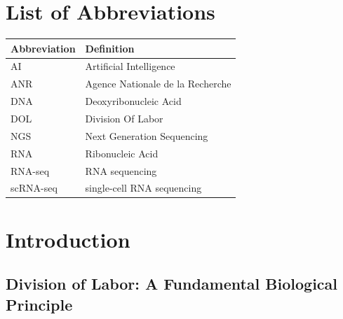 \documentclass[
  11pt,
  a4paper,
]{report}
\renewcommand*\listfigurename{List of Figures}
\newcommand\listfigurename{List of Figures}
\renewcommand*\listtablename{List of Tables}
\newcommand\listtablename{List of Tables}
\begin{document}

\chapter*{List of Abbreviations}\label{list-of-abbreviations}


\begin{longtable}[]{@{}ll@{}}
\toprule\noalign{}
Abbreviation & Definition \\
\midrule\noalign{}
\endhead
\bottomrule\noalign{}
\endlastfoot
AI & Artificial Intelligence \\
ANR & Agence Nationale de la Recherche \\
DNA & Deoxyribonucleic Acid \\
DOL & Division Of Labor \\
NGS & Next Generation Sequencing \\
RNA & Ribonucleic Acid \\
RNA-seq & RNA sequencing \\
scRNA-seq & single-cell RNA sequencing \\
\end{longtable}

\renewcommand{\listfigurename}{List of Figures}
\renewcommand{\listtablename}{List of Tables}

\clearpage
{}
\listoffigures

\clearpage
{}
\listoftables

\clearpage{}\setcounter{page}{1}


\chapter{Introduction}\label{sec-intro}

\section{Division of Labor: A Fundamental Biological
Principle}\label{division-of-labor-a-fundamental-biological-principle}
\end{document}
